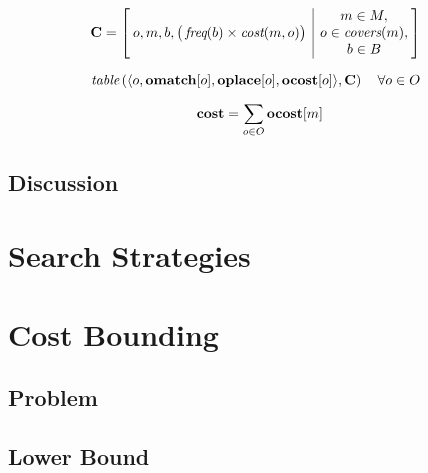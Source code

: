 \begin{equation}
  \hspace*{-2mm} %
  \mCostMatrix =
  \begin{bmatrix}
    \begin{array}{@{\:}c|c@{\:}}
        o, m, b, \big( \mFreq(b) \times \mOpCost(m, o) \big)
      & \begin{array}{@{}c@{}}
          m \in \mMatchSet, \\
          o \in \mCovers(m), \\
          b \in \mBlockSet \\
        \end{array}
    \end{array}
  \end{bmatrix}
  \labelEquation{cost-matrix}
\end{equation}

\begin{equation}
  \hspace*{-2mm} %
  \mTable\left(
    \langle
      o,
      \mVar{omatch}[o],
      \mVar{oplace}[o],
      \mVar{ocost}[o]
    \rangle,
    \mCostMatrix
  \right)
  \mQuantSep
  \forall o \in \mOpSet
  \labelEquation{omatch-oplace-ocost-connection}
\end{equation}

\begin{equation}
  \mVar{cost} = \sum_{o \in \mOpSet} \mVar{ocost}[m]
  \labelEquation{total-cost}
\end{equation}

\subsection{Discussion}

\section{Search Strategies}

\section{Cost Bounding}
\subsection{Problem}
\subsection{Lower Bound}
